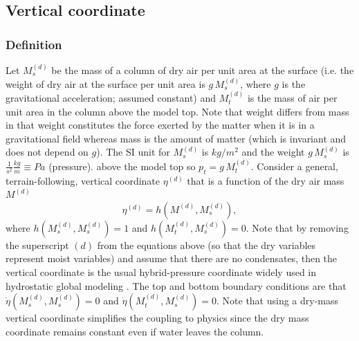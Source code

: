 \documentclass{agujournal}
\begin{document}
{%
%
%
\subsection{Vertical coordinate}\label{eq:vertical_coord}
\subsubsection{Definition}
Let $M^{(d)}_s$ be the mass of a column of dry air per unit area at the surface (i.e. the weight of dry air at the surface per unit area is $g\, M^{(d)}_s$, where $g$ is the gravitational acceleration; assumed constant) and $M_t^{(d)}$ is the mass of air per unit area in the column above the model top. Note that weight differs from mass in that weight constitutes the force exerted by the matter when it is in a gravitational field whereas mass is the amount of matter (which is invariant and does not depend on $g$). The SI unit for $M^{(d)}_s$ is $kg/m^2$ and the weight $g\, M^{(d)}_s$ is $\frac{1}{s^2}\frac{kg}{m}\equiv Pa$ (pressure). {\color{red}{We assume that the composition of dry air is constant and that there is no moisture}} above the model top so $p_t=g\, M_t^{(d)}$. Consider a general, terrain-following, vertical coordinate $\eta^{(d)}$ that is a function of the dry air mass $M^{(d)}$ 
\begin{equation}
\eta^{(d)}=h(M^{(d)},M_s^{(d)}),
\end{equation}
where $h(M_s^{(d)},M_s^{(d)})=1$ and $h(M_t^{(d)},M_s^{(d)})=0$. Note that by removing the superscript $(d)$ from the equations above (so that the dry variables represent moist variables) and assume that there are no condensates, then the vertical coordinate is the usual hybrid-pressure coordinate widely used in hydrostatic global modeling \citep{SB1981MWR}. The top and bottom boundary conditions are that $\dot{\eta}\left({M_s^{(d)},M_s^{(d)}}\right)=0$ and $\dot{\eta}\left( M_t^{(d)},M_s^{(d)}\right)=0$. Note that using a dry-mass vertical coordinate simplifies the coupling to physics since the dry mass coordinate remains constant even if water leaves the column.
}
\end{document}
